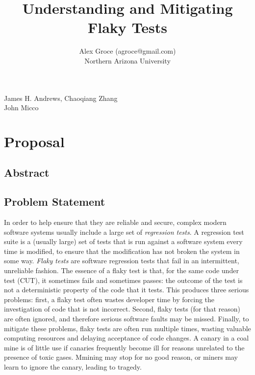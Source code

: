 \documentclass[10pt]{article}
\title{Understanding and Mitigating Flaky Tests}
\author{Alex Groce (agroce@gmail.com)\\Northern Arizona University}
\date{}
\begin{document}
\maketitle


 James H. Andrews, Chaoqiang Zhang \\
 John Micco
\section{Proposal}

\subsection{Abstract}

\subsection{Problem Statement}

In order to help ensure that they are reliable and secure, complex modern software systems usually include a large set of \emph{regression tests}.  A regression test suite is a (usually large) set of tests that is run against a software system every time is modified, to ensure that the modification has not broken the system in some way.
\emph{Flaky tests} \cite{miccoflaky} are software regression tests that fail in an intermittent, unreliable fashion.  The essence of a flaky test is that, for the same code under test (CUT), it sometimes fails and sometimes passes:  the outcome of the test is not a deterministic property of the code that it tests.  This produces three serious problems:  first, a flaky test often wastes developer time by forcing the investigation of code that is not incorrect.  Second, flaky tests (for that reason) are often ignored, and therefore serious software faults may be missed.  Finally, to mitigate these problems, flaky tests are often run multiple times, wasting valuable computing resources and delaying acceptance of code changes.  A canary in a coal mine is of little use if canaries frequently become ill for reasons unrelated to the presence of toxic gases.  Mmining may stop for no good reason, or miners may learn to ignore the canary, leading to tragedy.
\end{document}
